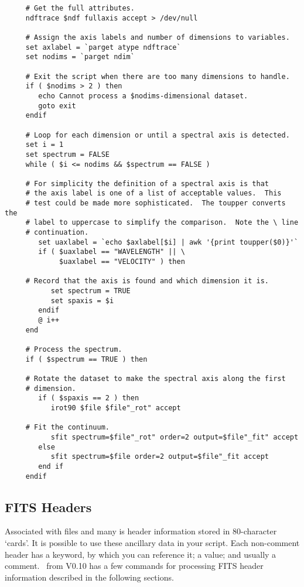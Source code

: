 \small
\begin{verbatim}
     # Get the full attributes.
     ndftrace $ndf fullaxis accept > /dev/null

     # Assign the axis labels and number of dimensions to variables.
     set axlabel = `parget atype ndftrace`
     set nodims = `parget ndim`
     
     # Exit the script when there are too many dimensions to handle.
     if ( $nodims > 2 ) then
        echo Cannot process a $nodims-dimensional dataset.
        goto exit
     endif

     # Loop for each dimension or until a spectral axis is detected.
     set i = 1
     set spectrum = FALSE
     while ( $i <= nodims && $spectrum == FALSE )

     # For simplicity the definition of a spectral axis is that
     # the axis label is one of a list of acceptable values.  This
     # test could be made more sophisticated.  The toupper converts the
     # label to uppercase to simplify the comparison.  Note the \ line
     # continuation.
        set uaxlabel = `echo $axlabel[$i] | awk '{print toupper($0)}'`
        if ( $uaxlabel == "WAVELENGTH" || \
             $uaxlabel == "VELOCITY" ) then

     # Record that the axis is found and which dimension it is.
           set spectrum = TRUE
           set spaxis = $i
        endif
        @ i++
     end
     
     # Process the spectrum.
     if ( $spectrum == TRUE ) then

     # Rotate the dataset to make the spectral axis along the first
     # dimension.
        if ( $spaxis == 2 ) then
           irot90 $file $file"_rot" accept

     # Fit the continuum.
           sfit spectrum=$file"_rot" order=2 output=$file"_fit" accept
        else
           sfit spectrum=$file order=2 output=$file"_fit accept
        end if
     endif
\end{verbatim}
\normalsize

\newpage
\subsection{FITS Headers\label{sc4_se_FITS_headers}}

Associated with  files and many
\NDFref{{\sf NDF}s} is header information stored in 80-character
`cards'.  It is possible to use these ancillary data in your script.
Each non-comment header has a keyword, by which you can reference it;
a value; and usually a comment.  \KAPPAref\ from V0.10 has a few
commands for processing {\sf FITS} header information described in the
following sections.

